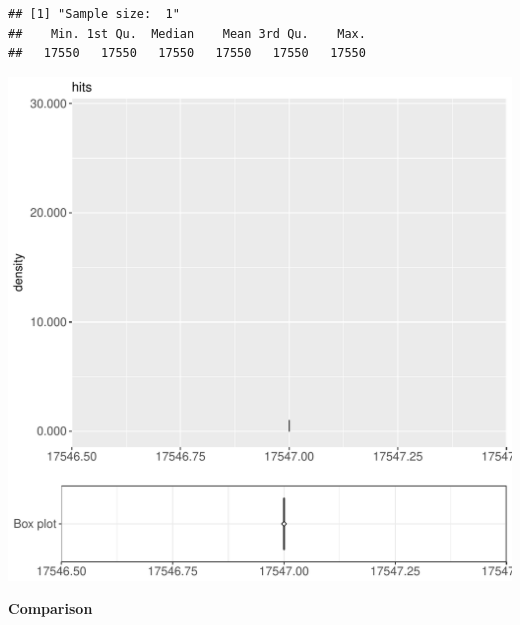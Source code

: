 \documentclass{article}\usepackage[]{graphicx}\usepackage[]{color}
\makeatletter
\def\maxwidth{ %
  \ifdim\Gin@nat@width>\linewidth
    \linewidth
  \else
    \Gin@nat@width
  \fi
}
\newenvironment{kframe}{%
 \def\at@end@of@kframe{}%
 \ifinner\ifhmode%
  \def\at@end@of@kframe{\end{minipage}}%
  \begin{minipage}{\columnwidth}%
 \fi\fi%
 \def\FrameCommand##1{\hskip\@totalleftmargin \hskip-\fboxsep
 \colorbox{shadecolor}{##1}\hskip-\fboxsep
     \hskip-\linewidth \hskip-\@totalleftmargin \hskip\columnwidth}%
 \MakeFramed {\advance\hsize-\width
   \@totalleftmargin\z@ \linewidth\hsize
   \@setminipage}}%
 {\par\unskip\endMakeFramed%
 \at@end@of@kframe}
\newenvironment{knitrout}{}{} %
\makeatother
\begin{document}
\begin{knitrout}
\color{fgcolor}\begin{kframe}
\begin{verbatim}
## [1] "Sample size:  1"
##    Min. 1st Qu.  Median    Mean 3rd Qu.    Max. 
##   17550   17550   17550   17550   17550   17550
\end{verbatim}


{\ttfamily\noindent\bfseries{}}\end{kframe}
\includegraphics[width=\maxwidth]{figure/RH3_trivialcaching_password-1} 

\end{knitrout}
  
 \textbf{Comparison}
  
\end{document}
